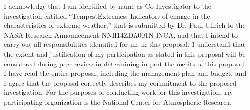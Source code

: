 \documentclass[11pt,stdletter,dateno,sigleft]{newlfm}
\begin{document}
\begin{newlfm}


I acknowledge that I am identified by name as Co-Investigator to the investigation entitled ``TempestExtremes: Indicators of change in the characteristics of extreme weather,'' that is submitted by Dr. Paul Ullrich to the NASA Research Announcement NNH14ZDA001N-INCA, and that I intend to carry out all responsibilities identified for me in this proposal. I understand that the extent and justification of my participation as stated in this proposal will be considered during peer review in determining in part the merits of this proposal. I have read the entire proposal, including the management plan and budget, and I agree that the proposal correctly describes my commitment to the proposed investigation. For the purposes of conducting work for this investigation, my participating organization is the National Center for Atmospheric Research.



\end{newlfm}
\end{document}
